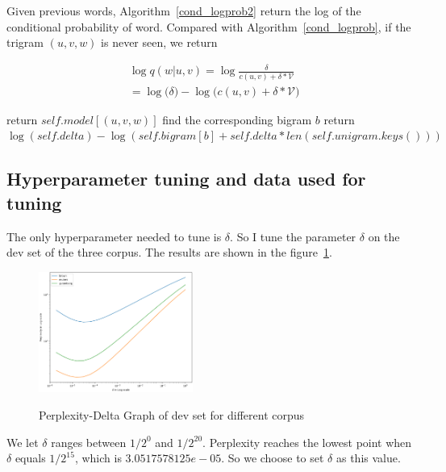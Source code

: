 Given previous words, Algorithm~\ref{cond_logprob2} return the log of the conditional probability of word. Compared with Algorithm~\ref{cond_logprob}, if the trigram $(u, v, w)$ is never seen, we return

$$
\begin{aligned}
&\log q(w | u, v)=\log\frac{\delta}{c(u, v)+\delta * \mathcal{V}}\\
&=\log \Big(\delta \Big) - \log \Big(c(u, v) + \delta * \mathcal{V} \Big)
\end{aligned}
$$

\begin{algorithm}[]
  \caption{$cond\_logpro$}
  \label{cond_logprob2}
  {
    return $self.model[(u, v, w)]$
  }
  \Else
  {
    find the corresponding bigram $b$\;
    {
        return $\log(self.delta) - \log(self.bigram[b]+self.delta*len(self.unigram.keys()))$
    }
  }
\end{algorithm}

\subsection{\textbf{Hyperparameter tuning and data used for tuning}}

The only hyperparameter needed to tune is $\delta$. So I tune the parameter $\delta$ on the dev set of the three corpus. The results are shown in the figure~\ref{fig:delta}.

\begin{figure}[h]
\caption{Perplexity-Delta Graph of dev set for different corpus}
\centering
\includegraphics[width=0.45\textwidth]{files/figs/Perplexity-Delta.png}
\label{fig:delta}
\end{figure}

We let $\delta$ ranges between $1/2^{0}$ and $1/2^{20}$. Perplexity reaches the lowest point when $\delta$ equals $1/2^{15}$, which is $3.0517578125e-05$. So we choose to set $\delta$ as this value.

